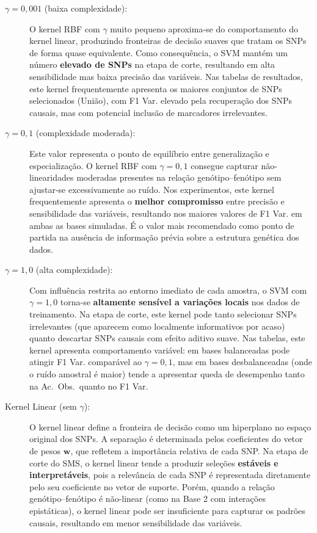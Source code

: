 \documentclass[12pt,a4paper]{article}
\newcommand{\novo}[1]{\textcolor{corNova}{#1}}
\begin{document}
\begin{description}
  \item[\novo{$\gamma = 0{,}001$ (baixa complexidade):}]
  \novo{O kernel RBF com $\gamma$ muito pequeno aproxima-se do comportamento do kernel linear, produzindo fronteiras de decisão suaves que tratam os SNPs de forma quase equivalente. Como consequência, o SVM mantém um número \textbf{elevado de SNPs} na etapa de corte, resultando em alta sensibilidade mas baixa precisão das variáveis. Nas tabelas de resultados, este kernel frequentemente apresenta os maiores conjuntos de SNPs selecionados (União), com F1 Var. elevado pela recuperação dos SNPs causais, mas com potencial inclusão de marcadores irrelevantes.}

  \item[\novo{$\gamma = 0{,}1$ (complexidade moderada):}]
  \novo{Este valor representa o ponto de equilíbrio entre generalização e especialização. O kernel RBF com $\gamma = 0{,}1$ consegue capturar não-linearidades moderadas presentes na relação genótipo--fenótipo sem ajustar-se excessivamente ao ruído. Nos experimentos, este kernel frequentemente apresenta o \textbf{melhor compromisso} entre precisão e sensibilidade das variáveis, resultando nos maiores valores de F1 Var. em ambas as bases simuladas. É o valor mais recomendado como ponto de partida na ausência de informação prévia sobre a estrutura genética dos dados.}

  \item[\novo{$\gamma = 1{,}0$ (alta complexidade):}]
  \novo{Com influência restrita ao entorno imediato de cada amostra, o SVM com $\gamma = 1{,}0$ torna-se \textbf{altamente sensível a variações locais} nos dados de treinamento. Na etapa de corte, este kernel pode tanto selecionar SNPs irrelevantes (que aparecem como localmente informativos por acaso) quanto descartar SNPs causais com efeito aditivo suave. Nas tabelas, este kernel apresenta comportamento variável: em bases balanceadas pode atingir F1 Var. comparável ao $\gamma = 0{,}1$, mas em bases desbalanceadas (onde o ruído amostral é maior) tende a apresentar queda de desempenho tanto na Ac.\ Obs.\ quanto no F1 Var.}

  \item[\novo{Kernel Linear (sem $\gamma$):}]
  \novo{O kernel linear define a fronteira de decisão como um hiperplano no espaço original dos SNPs. A separação é determinada pelos coeficientes do vetor de pesos $\mathbf{w}$, que refletem a importância relativa de cada SNP. Na etapa de corte do SMS, o kernel linear tende a produzir seleções \textbf{estáveis e interpretáveis}, pois a relevância de cada SNP é representada diretamente pelo seu coeficiente no vetor de suporte. Porém, quando a relação genótipo--fenótipo é não-linear (como na Base 2 com interações epistáticas), o kernel linear pode ser insuficiente para capturar os padrões causais, resultando em menor sensibilidade das variáveis.}
\end{description}
\end{document}
